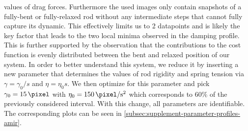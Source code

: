 \documentclass{article}
\begin{document}
values of drag forces.
Furthermore the used images only contain snapshots of a fully-bent or fully-relaxed rod without any
intermediate steps that cannot fully capture its dynamic.
This effectively limits us to 2 datapoints and is likely the key factor that leads to the two local
minima observed in the damping profile.
This is further supported by the observation that the contributions to the cost function is evenly
distributed between the bent and relaxed position of our system.
In order to better understand this system, we reduce it by inserting a new parameter that determines
the values of rod rigidity and spring tension via $\gamma=\gamma_0/s$ and $\eta=\eta_0 s$.
We then optimize for this parameter and pick $\gamma_0=\SI{15}{\pixel}$ with
$\eta_0=\SI{150}{\pixel\per\second\squared}$ which corresponds to $60\%$ of the previously considered
interval.
With this change, all parameters are identifiable.
The corresponding plots can be seen in \ref{subsec:supplement-parameter-profiles-amir}.
\end{document}
